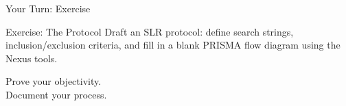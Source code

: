\documentclass[aspectratio=169]{beamer}
\begin{document}
\begin{frame}{Your Turn: Exercise}
  \begin{exampleblock}{Exercise: The Protocol}
    Draft an SLR protocol: define search strings, inclusion/exclusion criteria, and fill in a blank PRISMA flow diagram using the Nexus tools.
  \end{exampleblock}
\end{frame}

\begin{frame}[standout]
  Prove your objectivity.\\
  Document your process.
\end{frame}
\end{document}
